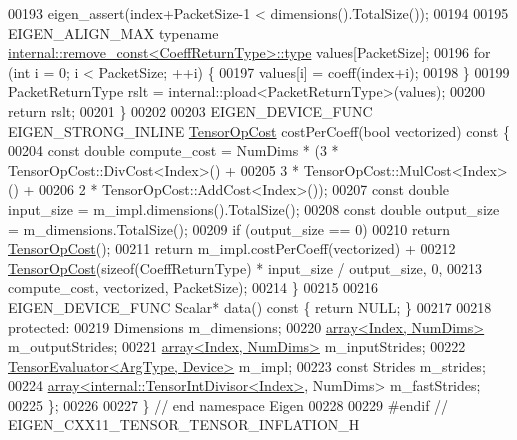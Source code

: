 \begin{DoxyCode}
00193     eigen\_assert(index+PacketSize-1 < dimensions().TotalSize());
00194 
00195     EIGEN\_ALIGN\_MAX \textcolor{keyword}{typename} \hyperlink{group___sparse_core___module}{internal::remove\_const<CoeffReturnType>::type}
       values[PacketSize];
00196     \textcolor{keywordflow}{for} (\textcolor{keywordtype}{int} i = 0; i < PacketSize; ++i) \{
00197       values[i] = coeff(index+i);
00198     \}
00199     PacketReturnType rslt = internal::pload<PacketReturnType>(values);
00200     \textcolor{keywordflow}{return} rslt;
00201   \}
00202 
00203   EIGEN\_DEVICE\_FUNC EIGEN\_STRONG\_INLINE \hyperlink{class_eigen_1_1_tensor_op_cost}{TensorOpCost} costPerCoeff(\textcolor{keywordtype}{bool} vectorized)\textcolor{keyword}{ const }\{
00204     \textcolor{keyword}{const} \textcolor{keywordtype}{double} compute\_cost = NumDims * (3 * TensorOpCost::DivCost<Index>() +
00205                                            3 * TensorOpCost::MulCost<Index>() +
00206                                            2 * TensorOpCost::AddCost<Index>());
00207     \textcolor{keyword}{const} \textcolor{keywordtype}{double} input\_size = m\_impl.dimensions().TotalSize();
00208     \textcolor{keyword}{const} \textcolor{keywordtype}{double} output\_size = m\_dimensions.TotalSize();
00209     \textcolor{keywordflow}{if} (output\_size == 0)
00210       \textcolor{keywordflow}{return} \hyperlink{class_eigen_1_1_tensor_op_cost}{TensorOpCost}();
00211     \textcolor{keywordflow}{return} m\_impl.costPerCoeff(vectorized) +
00212            \hyperlink{class_eigen_1_1_tensor_op_cost}{TensorOpCost}(\textcolor{keyword}{sizeof}(CoeffReturnType) * input\_size / output\_size, 0,
00213                         compute\_cost, vectorized, PacketSize);
00214   \}
00215 
00216   EIGEN\_DEVICE\_FUNC Scalar* data()\textcolor{keyword}{ const }\{ \textcolor{keywordflow}{return} NULL; \}
00217 
00218  \textcolor{keyword}{protected}:
00219   Dimensions m\_dimensions;
00220   \hyperlink{class_eigen_1_1array}{array<Index, NumDims>} m\_outputStrides;
00221   \hyperlink{class_eigen_1_1array}{array<Index, NumDims>} m\_inputStrides;
00222   \hyperlink{struct_eigen_1_1_tensor_evaluator}{TensorEvaluator<ArgType, Device>} m\_impl;
00223   \textcolor{keyword}{const} Strides m\_strides;
00224   \hyperlink{class_eigen_1_1array}{array<internal::TensorIntDivisor<Index>}, NumDims> m\_fastStrides;
00225 \};
00226 
00227 \} \textcolor{comment}{// end namespace Eigen}
00228 
00229 \textcolor{preprocessor}{#endif // EIGEN\_CXX11\_TENSOR\_TENSOR\_INFLATION\_H}
\end{DoxyCode}
